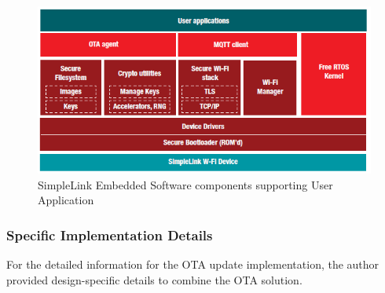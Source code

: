 \documentclass[12pt,a4paper]{article}
\begin{document}
\begin{figure}[H]
\centering
\includegraphics[scale=0.75]{SimpleLink_MCU.PNG}
\caption{SimpleLink Embedded Software components supporting User Application \cite{r27}}
\label{simplelink_embedded_software}
\end{figure}

\subsubsection{Specific Implementation Details}

For the detailed information for the OTA update implementation, the author provided design-specific details to combine the OTA solution.
\end{document}
